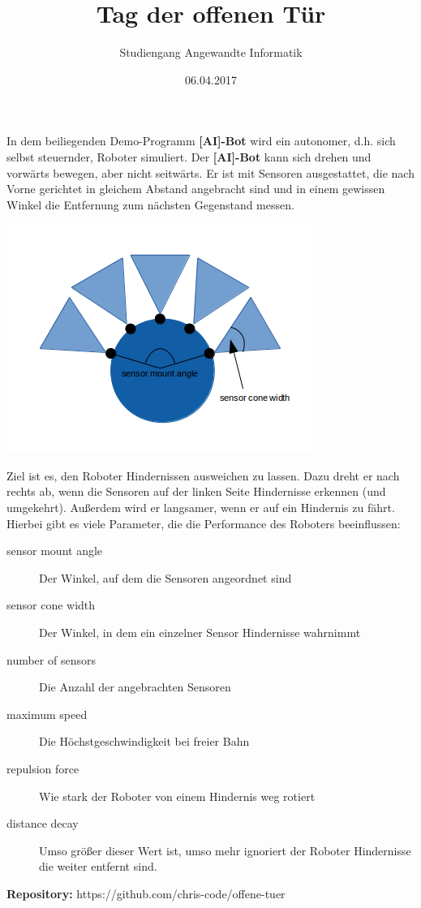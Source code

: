 \documentclass[11pt, a4paper]{article}
\title{Tag der offenen Tür}
\author{Studiengang Angewandte Informatik}
\date{06.04.2017}
\begin{document}
\maketitle

In dem beiliegenden Demo-Programm \textbf{[AI]-Bot} wird ein autonomer, d.h. sich selbst steuernder, Roboter simuliert. Der \textbf{[AI]-Bot} kann sich drehen und vorwärts bewegen, aber nicht seitwärts. Er ist mit Sensoren ausgestattet, die nach Vorne gerichtet in gleichem Abstand angebracht sind und in einem gewissen Winkel die Entfernung zum nächsten Gegenstand messen.

\begin{center}
	\includegraphics{robot.png}
\end{center}

Ziel ist es, den Roboter Hindernissen ausweichen zu lassen. Dazu dreht er nach rechts ab, wenn die Sensoren auf der linken Seite Hindernisse erkennen (und umgekehrt). Außerdem wird er langsamer, wenn er auf ein Hindernis zu fährt. Hierbei gibt es viele Parameter, die die Performance des Roboters beeinflussen:

\begin{description}
	\item[sensor mount angle] Der Winkel, auf dem die Sensoren angeordnet sind
	\item[sensor cone width] Der Winkel, in dem ein einzelner Sensor Hindernisse wahrnimmt
	\item[number of sensors] Die Anzahl der angebrachten Sensoren
	\item[maximum speed] Die Höchstgeschwindigkeit bei freier Bahn
	\item[repulsion force] Wie stark der Roboter von einem Hindernis weg rotiert
	\item[distance decay] Umso größer dieser Wert ist, umso mehr ignoriert der Roboter Hindernisse die weiter entfernt sind.
\end{description}

\vspace{1cm}

\textbf{Repository:} https://github.com/chris-code/offene-tuer
\end{document}

